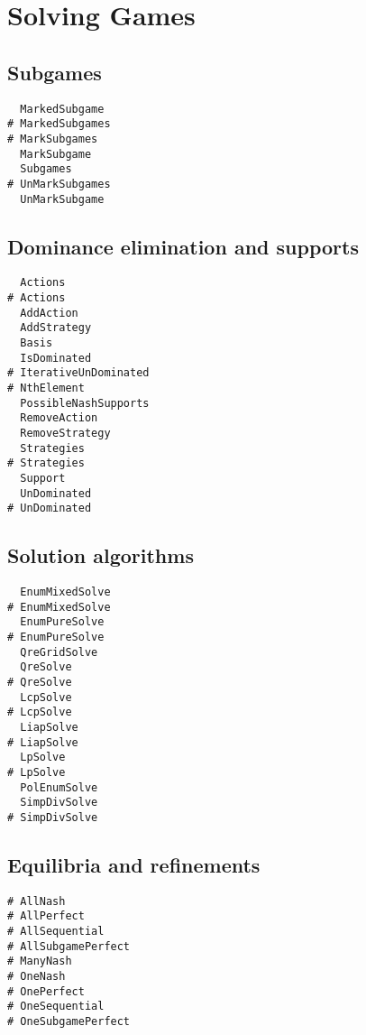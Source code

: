 \section{Solving Games}

\subsection{Subgames}

\begin{multicols}{3}
\begin{verbatim}
  MarkedSubgame 
# MarkedSubgames 
# MarkSubgames 
  MarkSubgame 
  Subgames 
# UnMarkSubgames 
  UnMarkSubgame 
\end{verbatim}
\end{multicols}

\subsection{Dominance elimination and supports}

\begin{multicols}{3}
\begin{verbatim}
  Actions
# Actions
  AddAction
  AddStrategy
  Basis
  IsDominated
# IterativeUnDominated
# NthElement
  PossibleNashSupports
  RemoveAction
  RemoveStrategy
  Strategies 
# Strategies 
  Support 
  UnDominated
# UnDominated
\end{verbatim}
\end{multicols}

\subsection{Solution algorithms}

\begin{multicols}{3}
\begin{verbatim}
  EnumMixedSolve 
# EnumMixedSolve 
  EnumPureSolve 
# EnumPureSolve 
  QreGridSolve 
  QreSolve 
# QreSolve 
  LcpSolve 
# LcpSolve 
  LiapSolve 
# LiapSolve 
  LpSolve 
# LpSolve 
  PolEnumSolve
  SimpDivSolve 
# SimpDivSolve 
\end{verbatim}
\end{multicols}

\subsection{Equilibria and refinements}

\begin{multicols}{3}
\begin{verbatim}
# AllNash
# AllPerfect
# AllSequential 
# AllSubgamePerfect
# ManyNash
# OneNash
# OnePerfect
# OneSequential
# OneSubgamePerfect
\end{verbatim}
\end{multicols}

